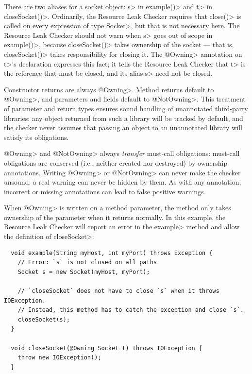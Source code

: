 There are two aliases for a socket object: \<s> in \<example()> and \<t> in
\<closeSocket()>.  Ordinarily, the Resource Leak Checker requires that
\<close()> is called on every expression of type \<Socket>, but that is not
necessary here.  The Resource Leak Checker should not warn when
\<s> goes out of scope in \<example()>, because \<closeSocket()> takes ownership
of the socket --- that is, \<closeSocket()> takes responsibility for closing
it. The \<@Owning> annotation on \<t>'s declaration expresses this fact; it
tells the Resource Leak Checker that \<t> is the reference that must be
closed, and its alias \<s> need not be closed.

Constructor returns are always \<@Owning>.
Method returns default to \<@Owning>,
and parameters and fields default to \<@NotOwning>. This treatment of parameter and
return types ensures sound handling of unannotated third-party libraries: any
object returned from such a library will be tracked by default, and the checker
never assumes that passing an object to an unannotated library will satisfy its obligations.

\<@Owning> and \<@NotOwning> always \emph{transfer} must-call obligations: must-call
obligations are conserved (i.e., neither created nor destroyed) by ownership annotations.
Writing \<@Owning> or \<@NotOwning> can never make the checker
unsound:  a real warning can never be hidden by them.
As with any annotation, incorrect or missing annotations can lead to false positive warnings.


When \<@Owning> is written on a method parameter, the method only takes ownership of the
parameter when it returns normally.  In this example, the Resource Leak Checker will report
an error in the \<example> method and allow the definition of \<closeSocket>:

\begin{verbatim}
  void example(String myHost, int myPort) throws Exception {
    // Error: `s` is not closed on all paths
    Socket s = new Socket(myHost, myPort);

    // `closeSocket` does not have to close `s` when it throws IOException.
    // Instead, this method has to catch the exception and close `s`.
    closeSocket(s);
  }

  void closeSocket(@Owning Socket t) throws IOException {
    throw new IOException();
  }
\end{verbatim}

